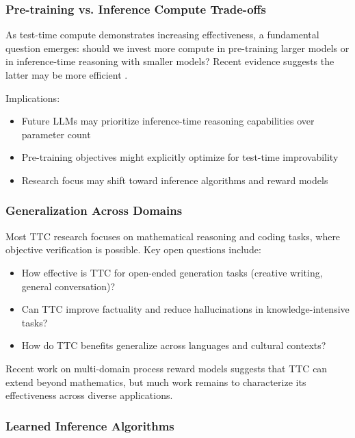 \subsubsection{Pre-training vs. Inference Compute Trade-offs}

As test-time compute demonstrates increasing effectiveness, a fundamental question emerges: should we invest more compute in pre-training larger models or in inference-time reasoning with smaller models? Recent evidence suggests the latter may be more efficient \citep{snell2024scaling,mit2025scaling}.

Implications:
\begin{itemize}
    \item Future LLMs may prioritize inference-time reasoning capabilities over parameter count
    \item Pre-training objectives might explicitly optimize for test-time improvability
    \item Research focus may shift toward inference algorithms and reward models
\end{itemize}

\subsubsection{Generalization Across Domains}

Most TTC research focuses on mathematical reasoning and coding tasks, where objective verification is possible. Key open questions include:

\begin{itemize}
    \item How effective is TTC for open-ended generation tasks (creative writing, general conversation)?
    \item Can TTC improve factuality and reduce hallucinations in knowledge-intensive tasks?
    \item How do TTC benefits generalize across languages and cultural contexts?
\end{itemize}

Recent work on multi-domain process reward models \citep{versaprm2025} suggests that TTC can extend beyond mathematics, but much work remains to characterize its effectiveness across diverse applications.

\subsubsection{Learned Inference Algorithms}


